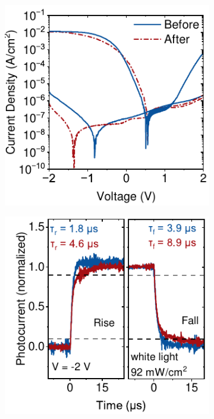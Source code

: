 \begin{figure}[htbp]
    \centering
    \begin{subfigure}{0.33\textwidth}
        \centering
        \includegraphics[width=\textwidth]{chapters/transport_layers/images/JV_Before_After.pdf}
        \caption{}
        \label{}
    \end{subfigure}
    \hfill
    \begin{subfigure}{0.32\textwidth}
        \centering
        \includegraphics[width=\textwidth]{chapters/transport_layers/images/TPC_Before_After.pdf}

\end{subfigure}
\end{figure}
